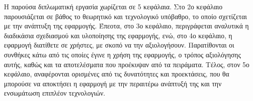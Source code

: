 Η παρούσα διπλωματική εργασία χωρίζεται σε 5 κεφάλαια. Στο 2ο κεφάλαιο παρουσιάζεται σε βάθος το θεωρητικό και τεχνολογικό υπόβαθρο, το οποίο σχετίζεται με την ανάπτυξη της εφαρμογής. Έπεοτα, στο 3ο κεφάλαιο, περιγράφεται αναλυτικά η διαδικάσια σχεδιασμού και υλοποίησης της εφαρμογής, ενώ, στο 4ο κεφάλαιο, η εφαρμογή διατίθετε σε χρήστες, με σκοπό να την αξιολογήσουν. Παρατίθονται οι συνθήκες κάτω από τις οποίες έγινε η χρήση της εφαρμογής, ο τρόπος αξιολόγησης αυτής, καθώς και τα αποτελέσματα που προέκυψαν από τα πειράματα. Τέλος, στον 5ο κεφάλαιο, αναφέρονται ορισμένες από τις δυνατότητες και προεκτάσεις, που θα μπορούσε να αποκτήσει η εφαρμογή με την περαιτέρω ανάπτυξή της και την ενσωμάτωση επιπλέον τεχνολογιών.